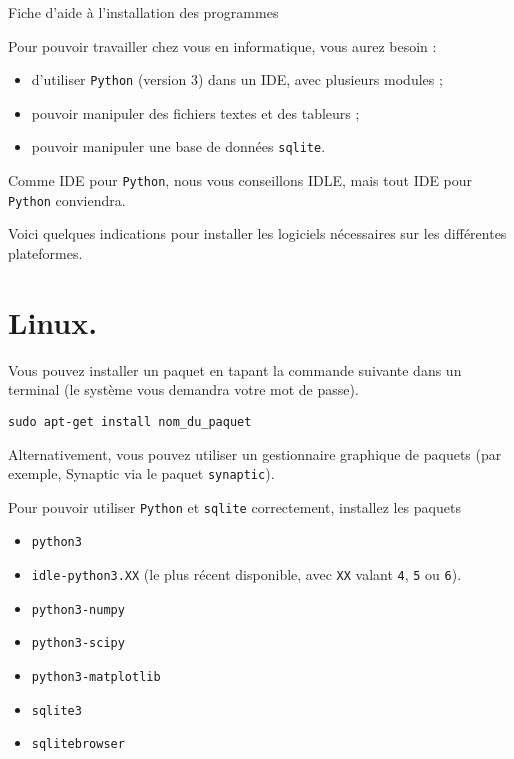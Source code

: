 
\begin{center}
\begin{Huge}
Fiche d'aide à l'installation des programmes
\end{Huge}
\end{center}
\vspace{2cm}

Pour pouvoir travailler chez vous en informatique, vous aurez besoin :
\begin{itemize}
  \item d'utiliser \texttt{Python} (version 3) dans un IDE, avec plusieurs modules ; 
  \item pouvoir manipuler des fichiers textes et des tableurs ; 
  \item pouvoir manipuler une base de données \texttt{sqlite}.
\end{itemize}
Comme IDE pour \texttt{Python}, nous vous conseillons {IDLE}, mais tout IDE pour \texttt{Python} conviendra. 

Voici quelques indications pour installer les logiciels nécessaires sur les différentes plateformes. 

\section{Linux.}\label{installation:sec:linux}

Vous pouvez installer un paquet en tapant la commande suivante dans un terminal (le système vous demandra votre mot de passe). 
\begin{verbatim}
sudo apt-get install nom_du_paquet
\end{verbatim}
Alternativement, vous pouvez utiliser un gestionnaire graphique de paquets (par exemple, Synaptic via le paquet \texttt{synaptic}).

Pour pouvoir utiliser \texttt{Python} et \texttt{sqlite} correctement, installez les paquets 
\begin{itemize}
  \item \texttt{python3}
  \item \texttt{idle-python3.XX} (le plus récent disponible, avec \texttt{XX} valant \texttt{4}, \texttt{5} ou \texttt{6}).
  \item \texttt{python3-numpy}
  \item \texttt{python3-scipy}
  \item \texttt{python3-matplotlib}
  \item \texttt{sqlite3}
  \item \texttt{sqlitebrowser}
\end{itemize}


